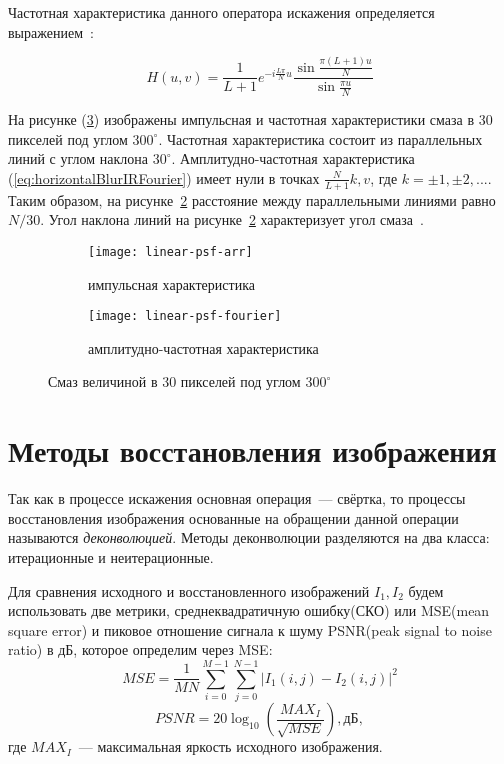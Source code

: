 Частотная характеристика данного оператора искажения определяется выражением~\cite{iterableImageRestorationBiemonLangdeik}:

\begin{equation}\label{eq:horizontalBlurIRFourier}
H(u,v) =       
	\frac{1}{L+1}e^{-i\frac{L\pi}{N}u}\frac{\sin\frac{\pi(L+1)u}{N}}{\sin\frac{\pi u}{N}}
\end{equation}

На рисунке (\ref{fig:linearPsf}) изображены импульсная и частотная характеристики смаза в 30 пикселей под углом $300^\circ$. Частотная характеристика состоит из параллельных линий с углом наклона $30^\circ$. Амплитудно-частотная характеристика (\ref{eq:horizontalBlurIRFourier}) имеет нули в точках $\frac{N}{L+1}k, v$, где $k = \pm 1, \pm2, ...$. Таким образом, на рисунке~\ref{fig:linearPsfFourier} расстояние между параллельными линиями равно $N/30$. Угол наклона линий на рисунке~\ref{fig:linearPsfFourier} характеризует угол смаза~\cite{iterableImageRestorationBiemonLangdeik}.
\begin{figure}[h!]
	\centering
	\begin{subfigure}[b]{0.45\textwidth}
		\texttt{[image: linear-psf-arr]}
		\caption{импульсная характеристика}
		\label{fig:linearPsfArr}
	\end{subfigure}%
	\hfill
	\begin{subfigure}[b]{0.45\textwidth}
		\texttt{[image: linear-psf-fourier]}%
		\caption{амплитудно-частотная характеристика}
		\label{fig:linearPsfFourier}
	\end{subfigure}%
	\caption{Смаз величиной в 30 пикселей под углом $300^{\circ}$}\label{fig:linearPsf}
\end{figure}

\section{Методы восстановления изображения}
Так как в процессе искажения основная операция~--- свёртка, то процессы восстановления изображения основанные на обращении данной операции называются \textit{деконволюцией}. Методы деконволюции разделяются на два класса: итерационные и неитерационные.

Для сравнения исходного и восстановленного изображений $I_1, I_2$ будем использовать две метрики, среднеквадратичную ошибку(СКО) или MSE(mean square error) и пиковое отношение сигнала к шуму PSNR(peak signal to noise ratio) в дБ, которое определим через MSE: 
\begin{equation}\label{eq:mse}
MSE = \frac{1}{MN}\sum_{i=0}^{M-1}\sum_{j=0}^{N-1}\left| I_1(i,j)-I_2(i,j)\right|^2
\end{equation}
\begin{equation}\label{eq:psnr}
PSNR = 20\log_{10}\left(\frac{MAX_I}{\sqrt{MSE}}\right), \text{дБ},
\end{equation}
где $MAX_I$~--- максимальная яркость исходного изображения.

